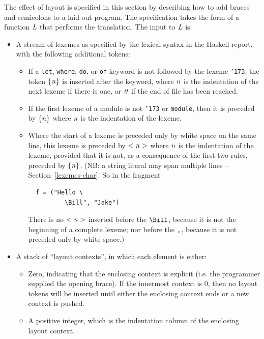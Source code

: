 The effect of layout is specified in this section by describing
how to add braces and semicolons to a laid-out program.  The specification
takes the form of a function \mbox{$\it L$} that performs the translation.
The input to \mbox{$\it L$} is:
\begin{itemize}
\item 
A stream of lexemes as specified by the lexical syntax in the Haskell report,
with the following additional tokens: 
\begin{itemize}
\item If a \mbox{\tt let}, \mbox{\tt where}, \mbox{\tt do}, or \mbox{\tt of} keyword is not followed by the lexeme \mbox{\tt {\char'173}}, 
the token \mbox{$\it \{n\}$} is inserted after the keyword, where \mbox{$\it n$} is the indentation of the 
next lexeme if there is one, or \mbox{$\it 0$} if the end of file has been reached.
\item If the first lexeme of a module is not \mbox{\tt {\char'173}} or \mbox{\tt module}, 
then it is preceded by \mbox{$\it \{n\}$} where \mbox{$\it n$} is the indentation of the lexeme. 
\item Where the start of a lexeme is preceded only by white space on the
   same line, this lexeme is preceded by \mbox{$\it <n>$} where \mbox{$\it n$}
   is the indentation of the lexeme, provided that it is not,
   as a consequence of the first two rules, preceded by \mbox{$\it \{n\}$}.
   (NB: a string literal may span multiple lines -- Section~\ref{lexemes-char}.  So in the fragment
\bprog
{\small\begin{verbatim}
  f = ("Hello \
          \Bill", "Jake")
\end{verbatim}}
\eprog
There is no \mbox{$\it <n>$} inserted before the \mbox{$\it \makebox{\tt {\char'134}Bill}$}, because it is not the beginning of
a complete lexeme; nor before the \mbox{$\it \makebox{\tt ,}$}, because it is not preceded only by white space.)
\end{itemize}

\item A stack of ``layout contexts'', in which each element is either:
\begin{itemize}
\item Zero, indicating that the enclosing context is explicit (i.e. the programmer 
supplied the opening brace). 
If the innermost context is 0, then no layout tokens will be inserted 
until either the enclosing context ends or a new context is pushed. 
\item A positive integer, which is the indentation column of the enclosing layout context. 
\end{itemize}
\end{itemize}

